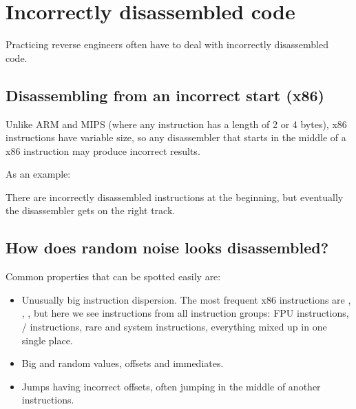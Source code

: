 \chapter{Incorrectly disassembled code}
\label{sec:incorrectly_disasmed_code}

Practicing reverse engineers often have to deal with incorrectly disassembled code.

\section{Disassembling from an incorrect start (x86)}

Unlike ARM and MIPS (where any instruction has a length of 2 or 4 bytes), x86 instructions have variable size,
so any disassembler that starts in the middle of a x86 instruction may produce incorrect results.

As an example:



There are incorrectly disassembled instructions at the beginning, but eventually the disassembler gets on the right 
track.

\section{How does random noise looks disassembled?}

Common properties that can be spotted easily are:

\begin{itemize}
\item Unusually big instruction dispersion.
The most frequent x86 instructions are \PUSH{}, \MOV{}, \CALL{}, 
but here we see
instructions from all instruction groups: \ac{FPU} instructions, / instructions, rare and system instructions,
everything mixed up in one single place.

\item Big and random values, offsets and immediates.

\item Jumps having incorrect offsets, often jumping in the middle of another instructions.
\end{itemize}



